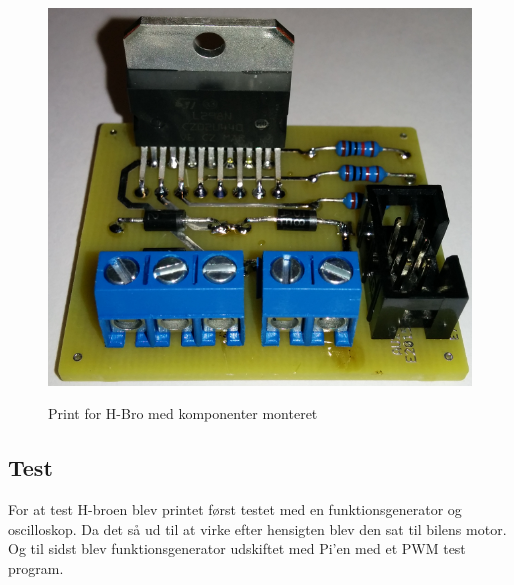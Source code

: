 \begin{figure}[h]
	\centering
	\includegraphics[width=\textwidth* 5/10]{../fig/billeder/Print_H_Bro}
	\label{fig:Print_H_Bro_finished}
	\caption{Print for H-Bro med komponenter monteret}
\end{figure}

\subsection{Test}

For at test H-broen blev printet først testet med en funktionsgenerator og oscilloskop. Da det så ud til at virke efter hensigten blev den sat til bilens motor. Og til sidst blev funktionsgenerator udskiftet med Pi'en med et PWM test program.
\clearpage